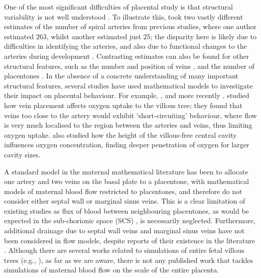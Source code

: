         One of the most significant difficulties of placental study is that structural variability is not well understood \cite{jensenBloodFlowTransport2019}. To illustrate this, \citeauthor{benirschkePathologyHumanPlacenta2012} \cite{benirschkePathologyHumanPlacenta2012} took two vastly different estimates of the number of spiral arteries from previous studies, where one author estimated $263$, whilst another estimated just $25$; the disparity here is likely due to difficulties in identifying the arteries, and also due to functional changes to the arteries during development \cite{benirschkePathologyHumanPlacenta2012}. Contrasting estimates can also be found for other structural features, such as the number and position of veins \cite{chernyavskyMathematicalModelIntervillous2010,boydHumanPlacenta1970}, and the number of placentones \cite{benirschkePathologyHumanPlacenta2012,kaufmannPlacentalVascularizationBlood1988,serovOptimalVilliDensity2015,boydHumanPlacenta1970}. In the absence of a concrete understanding of many important structural features, several studies have used mathematical models to investigate their impact on placental behaviour. For example, \citeauthor{chernyavskyMathematicalModelIntervillous2010} \cite{chernyavskyMathematicalModelIntervillous2010}, and more recently \citeauthor{meklerImpactTissuePorosity2022} \cite{meklerImpactTissuePorosity2022}, studied how vein placement affects oxygen uptake to the villous tree; they found that veins too close to the artery would exhibit `short-circuiting' behaviour, where flow is very much localised to the region between the arteries and veins, thus limiting oxygen uptake. \citeauthor{chernyavskyMathematicalModelIntervillous2010} \cite{chernyavskyMathematicalModelIntervillous2010} also studied how the height of the villous-free central cavity influences oxygen concentration, finding deeper penetration of oxygen for larger cavity sizes.

        A standard model in the maternal mathematical literature has been to allocate one artery and two veins on the basal plate to a placentone, with mathematical models of maternal blood flow restricted to placentones, and therefore do not consider either septal wall or marginal sinus veins. This is a clear limitation of existing studies as flux of blood between neighbouring placentones, as would be expected in the sub-chorionic space (SCS) \cite{jensenBloodFlowTransport2019}, is necessarily neglected. Furthermore, additional drainage due to septal wall veins and marginal sinus veins have not been considered in flow models, despite reports of their existence in the literature \cite{hempstockIntralobularDifferencesAntioxidant2003,AMANITIS2023e68,nanaevHumanPlacentaEncircled2000}. Although there are several works related to simulations of entire fetal villous trees (e.g., \cite{clarkMultiscaleModellingFeto2015,tunDifferencesPlacentalCapillary2019}), as far as we are aware, there is not any published work that tackles simulations of maternal blood flow on the scale of the entire placenta.
        

